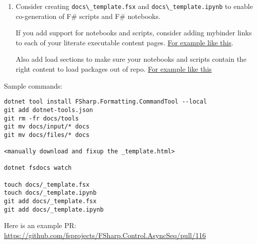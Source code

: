 \documentclass{article}
\begin{document}
\begin{enumerate}
\begin{lstlisting}
\end{lstlisting}

\item 

Consider creating \texttt{docs{\textbackslash}\_template.fsx} and \texttt{docs{\textbackslash}\_template.ipynb} to enable co-generation of F\# scripts and F\# notebooks.


If you add support for notebooks and scripts, consider adding mybinder links to each of your literate executable content pages. \href{https://github.com/fsprojects/FSharp.Formatting/blob/master/docs/literate.fsx\#L19}{For example like this}.


Also add load sections to make sure your notebooks and scripts contain the right content to load packages out of repo.  \href{https://github.com/fsprojects/FSharp.Formatting/blob/master/docs/literate.fsx\#L1}{For example like this}

\end{enumerate}



Sample commands:
\begin{lstlisting}
dotnet tool install FSharp.Formatting.CommandTool --local
git add dotnet-tools.json   
git rm -fr docs/tools
git mv docs/input/* docs
git mv docs/files/* docs

<manually download and fixup the _template.html>

dotnet fsdocs watch

touch docs/_template.fsx
touch docs/_template.ipynb
git add docs/_template.fsx
git add docs/_template.ipynb

\end{lstlisting}


Here is an example PR: \href{https://github.com/fsprojects/FSharp.Control.AsyncSeq/pull/116}{https://github.com/fsprojects/FSharp.Control.AsyncSeq/pull/116}
\end{document}

